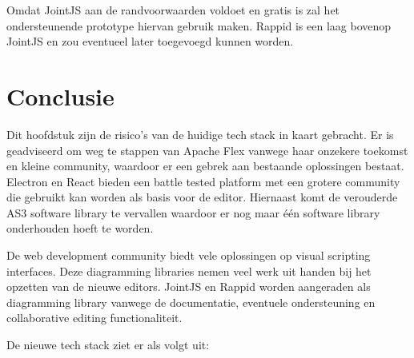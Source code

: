 Omdat JointJS aan de randvoorwaarden voldoet en gratis is zal het ondersteunende prototype hiervan gebruik maken. Rappid is een laag bovenop JointJS en zou eventueel later toegevoegd kunnen worden.

\section{Conclusie}
Dit hoofdstuk zijn de risico’s van de huidige tech stack in kaart gebracht. Er is geadviseerd om weg te stappen van Apache Flex vanwege haar onzekere toekomst en kleine community, waardoor er een gebrek aan bestaande oplossingen bestaat. Electron en React bieden een battle tested platform met een grotere community die gebruikt kan worden als basis voor de editor. Hiernaast komt de verouderde AS3 software library te vervallen waardoor er nog maar één software library onderhouden hoeft te worden.

De web development community biedt vele oplossingen op visual scripting interfaces. Deze diagramming libraries nemen veel werk uit handen bij het opzetten van de nieuwe editors. JointJS en Rappid worden aangeraden als diagramming library vanwege de documentatie, eventuele ondersteuning en collaborative editing functionaliteit.

De nieuwe tech stack ziet er als volgt uit: 

